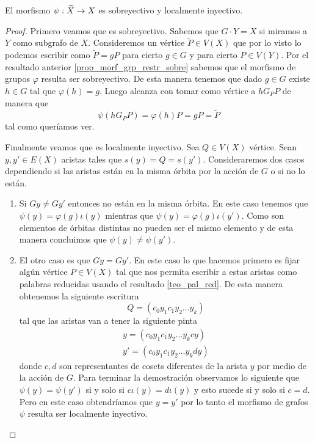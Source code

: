 \documentclass[tesis.tex]{subfiles}
\begin{document}
\begin{prop}
	El morfismo $\psi: \widetilde X \to X$ es sobreyectivo y localmente inyectivo.
\end{prop}
\begin{proof}
	Primero veamos que es sobreyectivo.
	Sabemos que $G \cdot Y = X$ si miramos a $Y$ como subgrafo de $X$.
	Consideremos un vértice $\widetilde P \in V(X)$ que por lo visto lo podemos escribir como $\widetilde P = g P$ para cierto $g \in G$ y para cierto $P \in V(Y)$.
	Por el resultado anterior \ref{prop_morf_grp_restr_sobre} sabemos que el morfismo de grupos $\varphi$ resulta ser sobreyectivo.
	De esta manera tenemos que dado $g \in G$ existe $h \in G$ tal que $\varphi(h) = g$. 
	Luego alcanza con tomar como vértice a $h G_P P $ de manera que 
	\[
	\psi(h G_P P ) = \varphi(h) P = g P = \widetilde P
	\]
	tal como queríamos ver.
	
	
	Finalmente veamos que es localmente inyectivo.
	Sea $Q \in V(X)$ vértice. 
	Sean $y,y' \in E(X)$ aristas tales que $s(y) = Q = s(y')$.
	Consideraremos dos casos dependiendo si las aristas están en la misma órbita por la acción de $G$ o si no lo están.
	
	\begin{enumerate}
		\item Si $Gy \neq Gy'$ entonces no están en la misma órbita.
		En este caso tenemos que $\psi(y) = \varphi(g) \iota (y)$ mientras que $\psi(y) = \varphi(g) \iota (y')$.
		Como son elementos de órbitas distintas no pueden ser el mismo elemento y de esta manera concluimos que $\psi(y) \neq \psi(y').$
		\item El otro caso es que $Gy = Gy'$. 
		En este caso lo que hacemos primero es fijar algún vértice $P \in V(X)$ tal que nos permita escribir a estas aristas como palabras reducidas usando el resultado \ref{teo_pal_red}.
		De esta manera obtenemos la siguiente escritura 
		\[
		Q = (c_0y_1c_1y_2 \dots y_k)
		\]
		tal que las aristas van a tener la siguiente pinta 
		\begin{align*}
			y = (c_0y_1c_1y_2 \dots y_k c y) \\
			y' = (c_0y_1c_1y_2 \dots y_k d y)
		\end{align*}
		donde $c,d$ son representantes de cosets diferentes de la arista $y$ por medio de la acción de $G$.
		Para terminar la demostración observamos lo siguiente que $\psi(y) = \psi(y')$ si y solo si $c \iota(y) = d \iota(y)$ y esto sucede si y solo si $c = d$. 
		Pero en este caso obtendríamos que $y = y'$ por lo tanto el morfismo de grafos $\psi$ resulta ser localmente inyectivo.
	\end{enumerate}
\end{proof}
\end{document}
